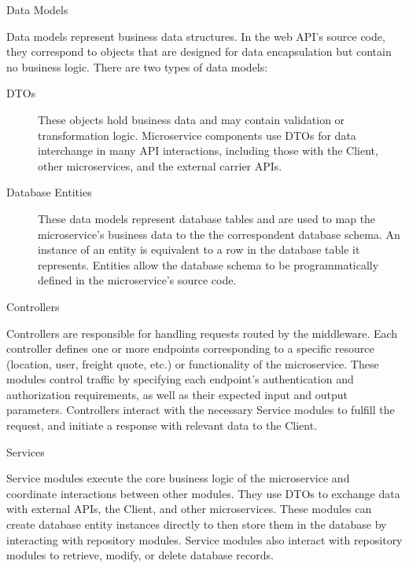 \documentclass[12pt, reqno, oneside]{amsbook}
\makeatletter
\def\subsection{\@startsection{subsection}{2}%
      \z@{.5\linespacing\@plus.7\linespacing}{.25\linespacing}%
      {\normalfont\bfseries\flushleft}}
\theoremstyle{definition}
\theoremstyle{definition}
\numberwithin{section}{chapter}
\numberwithin{table}{chapter}
\numberwithin{figure}{chapter}
\makeatother
\begin{document}
\subsection{Data Models}

Data models represent business data structures. In the web \ac{API}'s source code, they correspond to objects that are designed for data encapsulation but contain no business logic. There are two types of data models:

\begin{description}
  \item[\acp{DTO}] These objects hold business data and may contain validation or transformation logic. Microservice components use \acp{DTO} for data interchange in many \ac{API} interactions, including those with the Client, other microservices, and the external carrier \acp{API}.
  \item[Database Entities] These data models represent database tables and are used to map the microservice's business data to the the correspondent database schema. An instance of an entity is equivalent to a row in the database table it represents. Entities allow the database schema to be programmatically defined in the microservice's source code.
\end{description}

\subsection{Controllers}

Controllers are responsible for handling requests routed by the middleware. Each controller defines one or more endpoints corresponding to a specific resource (location, user, freight quote, etc.) or functionality of the microservice. These modules control traffic by specifying each endpoint's authentication and authorization requirements, as well as their expected input and output parameters. Controllers interact with the necessary Service modules to fulfill the request, and initiate a response with relevant data to the Client.

\subsection{Services}

Service modules execute the core business logic of the microservice and coordinate interactions between other modules. They use \acp{DTO} to exchange data with external \acp{API}, the Client, and other microservices. These modules can create database entity instances directly to then store them in the database by interacting with repository modules. Service modules also interact with repository modules to retrieve, modify, or delete database records.
\end{document}
